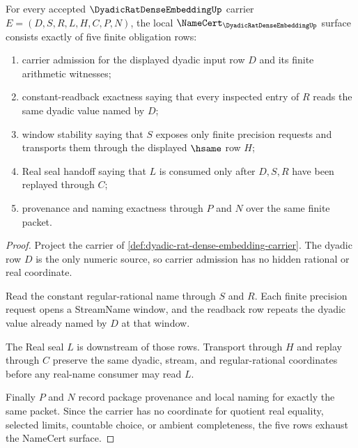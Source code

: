 \begin{theorem}
\label{thm:dyadic-rat-dense-embedding-namecert-obligations}
For every accepted $\DyadicRatDenseEmbeddingUp$ carrier $E=(D,S,R,L,H,C,P,N)$, the local $\NameCert_{\DyadicRatDenseEmbeddingUp}$ surface consists exactly of five finite obligation rows:
\begin{enumerate}
\item carrier admission for the displayed dyadic input row $D$ and its finite arithmetic witnesses;
\item constant-readback exactness saying that every inspected entry of $R$ reads the same dyadic value named by $D$;
\item window stability saying that $S$ exposes only finite precision requests and transports them through the displayed $\hsame$ row $H$;
\item Real seal handoff saying that $L$ is consumed only after $D,S,R$ have been replayed through $C$;
\item provenance and naming exactness through $P$ and $N$ over the same finite packet.
\end{enumerate}
\end{theorem}
\begin{proof}
Project the carrier of \autoref{def:dyadic-rat-dense-embedding-carrier}. The dyadic row $D$ is the only numeric source, so carrier admission has no hidden rational or real coordinate.

Read the constant regular-rational name through $S$ and $R$. Each finite precision request opens a StreamName window, and the readback row repeats the dyadic value already named by $D$ at that window.

The Real seal $L$ is downstream of those rows. Transport through $H$ and replay through $C$ preserve the same dyadic, stream, and regular-rational coordinates before any real-name consumer may read $L$.

Finally $P$ and $N$ record package provenance and local naming for exactly the same packet. Since the carrier has no coordinate for quotient real equality, selected limits, countable choice, or ambient completeness, the five rows exhaust the NameCert surface.
\end{proof}

